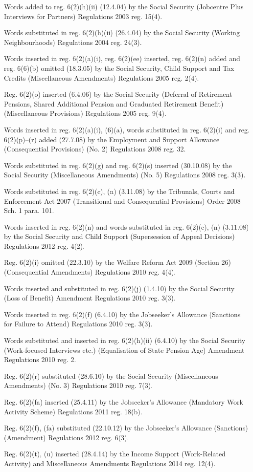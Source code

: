 \documentclass[12pt,a4paper]{article}
\begin{document}
{Words added to reg. 6(2)(h)(ii) (12.4.04) by the Social Security (Jobcentre Plus Interviews for Partners) Regulations 2003 reg. 15(4).

Words substituted in reg. 6(2)(h)(ii) (26.4.04) by the Social Security (Working Neighbourhoods) Regulations 2004 reg. 24(3).

Words inserted in reg. 6(2)(a)(i), reg. 6(2)(ee) inserted, reg. 6(2)(n) added and reg. 6(6)(b) omitted (18.3.05) by the Social Security, Child Support and Tax Credits (Miscellaneous Amendments) Regulations 2005 reg. 2(4).

Reg. 6(2)(o) inserted (6.4.06) by the Social Security (Deferral of Retirement Pensions, Shared Additional Pension and Graduated Retirement Benefit) (Miscellaneous Provisions) Regulations 2005 reg. 9(4).

\begin{sloppypar}
Words inserted in reg. 6(2)(a)(i), (6)(a), words substituted in reg. 6(2)(i) and reg. 6(2)(p)--(r) added (27.7.08) by the Employment and Support Allowance (Consequential Provisions) (No. 2) Regulations 2008 reg. 32.
\end{sloppypar}

Words substituted in reg. 6(2)(g) and reg. 6(2)(s) inserted (30.10.08) by the Social Security (Miscellaneous Amendments) (No. 5) Regulations 2008 reg. 3(3).

Words substituted in reg. 6(2)(c), (n) (3.11.08) by the Tribunals, Courts and Enforcement Act 2007 (Transitional and Consequential Provisions) Order 2008 Sch. 1 para. 101.

Words inserted in reg. 6(2)(n) and words substituted in reg. 6(2)(c), (n) (3.11.08) by the Social Security and Child Support (Supersession of Appeal Decisions) Regulations 2012 reg. 4(2).

Reg. 6(2)(i) omitted (22.3.10) by the Welfare Reform Act 2009 (Section 26) (Consequential Amendments) Regulations 2010 reg. 4(4).

Words inserted and substituted in reg. 6(2)(j) (1.4.10) by the Social Security (Loss of Benefit) Amendment Regulations 2010 reg. 3(3).

Words inserted in reg. 6(2)(f) (6.4.10) by the Jobseeker’s Allowance (Sanctions for Failure to Attend) Regulations 2010 reg. 3(3).

Words substituted and inserted in reg. 6(2)(h)(ii) (6.4.10) by the Social Security (Work-focused Interviews etc.) (Equalisation of State Pension Age) Amendment Regulations 2010 reg. 2.

Reg. 6(2)(r) substituted (28.6.10) by the Social Security (Miscellaneous Amendments) (No. 3) Regulations 2010 reg. 7(3).

Reg. 6(2)(fa) inserted (25.4.11) by the Jobseeker’s Allowance (Mandatory Work Activity Scheme) Regulations 2011 reg. 18(b).

Reg. 6(2)(f), (fa) substituted (22.10.12) by the Jobseeker’s Allowance (Sanctions) (Amendment) Regulations 2012 reg. 6(3).

Reg. 6(2)(t), (u) inserted (28.4.14) by the Income Support (Work-Related Activity) and Miscellaneous Amendments Regulations 2014 reg. 12(4).
}
\end{document}
